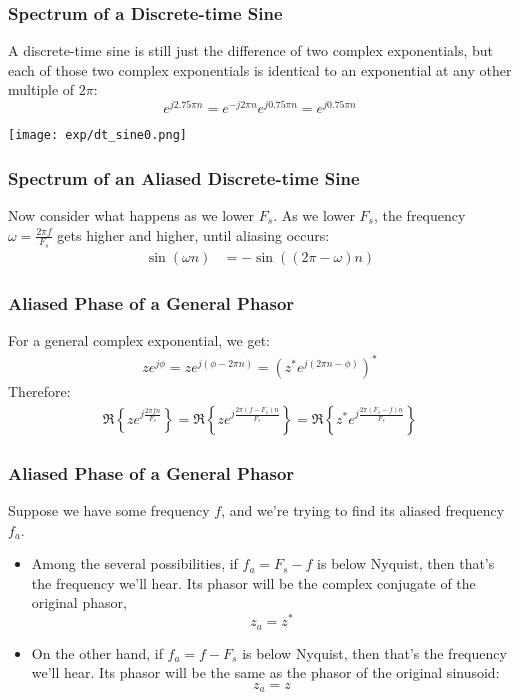 \documentclass{beamer}
\begin{document}
\begin{frame}
  \frametitle{Spectrum of a Discrete-time Sine}

  A discrete-time sine is still just the difference of two complex
  exponentials, but each of those two complex exponentials is
  identical to an exponential at any other multiple of $2\pi$:
  \begin{displaymath}
    e^{j2.75\pi n}=e^{-j2\pi n}e^{j0.75\pi n}=e^{j0.75\pi n}
  \end{displaymath}
  \centerline{\texttt{[image: exp/dt\_sine0.png]}}
\end{frame}

\begin{frame}
  \frametitle{Spectrum of an Aliased Discrete-time Sine}

  Now consider what happens as we lower $F_s$.  As we lower $F_s$, the
  frequency $\omega=\frac{2\pi f}{F_s}$ gets higher and higher, until
    aliasing occurs:
    \begin{align*}
      \sin\left(\omega n\right) &= -\sin\left((2\pi-\omega)n\right)
    \end{align*}
    \centerline{}
\end{frame}



\begin{frame}
  \frametitle{Aliased Phase of a General Phasor}

  For a general complex exponential, we get:
  \begin{align*}
    ze^{j\phi} = ze^{j(\phi-2\pi n)} = \left(z^* e^{j(2\pi n-\phi)}\right)^*
  \end{align*}
  Therefore:
  \begin{align*}
    \Re\left\{z e^{j\frac{2\pi fn}{F_s}} \right\} =
    \Re\left\{z e^{j\frac{2\pi (f-F_s)n}{F_s}} \right\} =
    \Re\left\{z^* e^{j\frac{2\pi (F_s-f)n}{F_s}} \right\}
  \end{align*}
\end{frame}


\begin{frame}
  \frametitle{Aliased Phase of a General Phasor}

  Suppose we have some frequency $f$, and we're trying to find its
  aliased frequency $f_a$.
  \begin{itemize}
  \item Among the several possibilities, if $f_a=F_s-f$ is below
    Nyquist, then that's the frequency we'll hear.  Its phasor will be
    the complex conjugate of the original phasor,
    \[
    z_a = z^*
    \]
  \item On the other hand, if $f_a=f-F_s$ is below Nyquist, then
    that's the frequency we'll hear.  Its phasor will be the same as
    the phasor of the original sinusoid:
    \[
    z_a = z
    \]    
  \end{itemize}
  
\end{frame}
\end{document}
